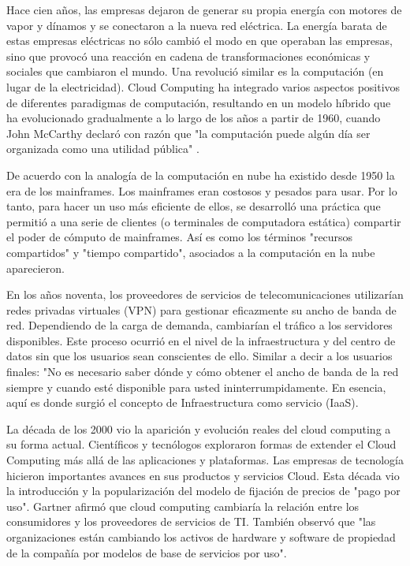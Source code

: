 \documentclass[a4paper, 12pt]{report}
\begin{document}
\begin{justify}
Hace cien años, las empresas dejaron de generar su propia energ\'ia con motores de vapor y dínamos y se conectaron a la nueva red el\'ectrica. La energía barata de estas empresas el\'ectricas no s\'olo cambi\'o el modo en que operaban las empresas, sino que provoc\'o una reacción en cadena de transformaciones econ\'omicas y sociales que cambiaron el mundo. Una revoluci\'o similar es la computaci\'on (en lugar de la electricidad). Cloud Computing ha integrado varios aspectos positivos de diferentes paradigmas de computación, resultando en un modelo híbrido que ha evolucionado gradualmente a lo largo de los años a partir de 1960, cuando John McCarthy declar\'o con raz\'on que "la computaci\'on puede alg\'un d\'ia ser organizada como una utilidad p\'ublica" \cite{Abhishek}.

De acuerdo con \cite{Pritam} la analogía de la computación en nube ha existido desde 1950 la era de los mainframes. Los mainframes eran costosos y pesados para usar. Por lo tanto, para hacer un uso más eficiente de ellos, se desarrolló una práctica que permitió a una serie de clientes (o terminales de computadora estática) compartir el poder de cómputo de mainframes. Así es como los términos "recursos compartidos" y "tiempo compartido", asociados a la computación en la nube aparecieron.

En los años noventa, los proveedores de servicios de telecomunicaciones utilizarían redes privadas virtuales (VPN) para gestionar eficazmente su ancho de banda de red. Dependiendo de la carga de demanda, cambiarían el tráfico a los servidores disponibles. Este proceso ocurrió en el nivel de la infraestructura y del centro de datos sin que los usuarios sean conscientes de ello. Similar a decir a los usuarios finales: "No es necesario saber dónde y cómo obtener el ancho de banda de la red siempre y cuando esté disponible para usted ininterrumpidamente. En esencia, aquí es donde surgió el concepto de Infraestructura como servicio (IaaS).

La década de los 2000 vio la aparición y evolución reales del cloud computing a su forma actual. Científicos y tecnólogos exploraron formas de extender el Cloud Computing más allá de las aplicaciones y plataformas. Las empresas de tecnología hicieron importantes avances en sus productos y servicios Cloud. Esta década vio la introducción y la popularización del modelo de fijación de precios de "pago por uso". Gartner afirmó que cloud computing cambiaría la relación entre los consumidores y los proveedores de servicios de TI. También observó que "las organizaciones están cambiando los activos de hardware y software de propiedad de la compañía por modelos de base de servicios por uso".


\end{justify}
\end{document}
